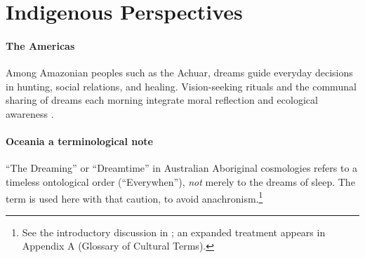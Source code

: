 \section{Indigenous Perspectives}\label{sec:indigenous}

\paragraph{The Americas}
Among Amazonian peoples such as the Achuar, dreams guide everyday decisions in hunting, social relations, and healing.  
Vision-seeking rituals and the communal sharing of dreams each morning integrate moral reflection and ecological awareness \citep{descola1996nature,tedlock1987anthrodreaming}.

\paragraph{Oceania  \-  a terminological note}
“The Dreaming” or “Dreamtime” in Australian Aboriginal cosmologies refers to a timeless ontological order (“Everywhen”), \emph{not} merely to the dreams of sleep.  
The term is used here with that caution, to avoid anachronism.\footnote{See the introductory discussion in \citep{dreaming_aborg}; an expanded treatment appears in Appendix A (Glossary of Cultural Terms).}